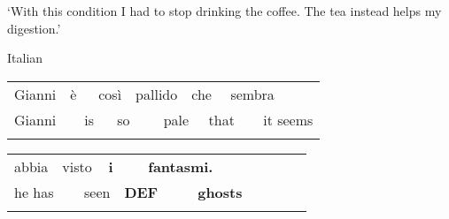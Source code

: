 \begin{styleTranslation}
‘With this condition I had to stop drinking the coffee. The tea instead helps my digestion.’

\end{styleTranslation}

\begin{listWWNumileveli}
\item {}

\begin{styleExample}
\label{bkm:Ref172696628}Italian

\end{styleExample}

\end{listWWNumileveli}

\begin{tabular}{llllllllllll}
\lsptoprule
Gianni & \multicolumn{2}{l}{è

} & \multicolumn{2}{l}{così

} & \multicolumn{2}{l}{pallido

} & \multicolumn{2}{l}{che

} & \multicolumn{2}{l}{sembra

} & \\
\multicolumn{2}{l}{Gianni

} & \multicolumn{2}{l}{is

} & \multicolumn{2}{l}{so

} & \multicolumn{2}{l}{pale

} & \multicolumn{2}{l}{that

} & \multicolumn{2}{l}{it seems

}\\
\lspbottomrule
\end{tabular}

\begin{tabular}{llllllllllll}
\lsptoprule
abbia & \multicolumn{2}{l}{visto

} & \multicolumn{2}{l}{{\bfseries i}

} & \multicolumn{2}{l}{{\bfseries fantasmi.}

} & \multicolumn{2}{l}{} & \multicolumn{2}{l}{} & \\
\multicolumn{2}{l}{he has

} & \multicolumn{2}{l}{seen

} & \multicolumn{2}{l}{{\bfseries DEF}

} & \multicolumn{2}{l}{{\bfseries ghosts}

} & \multicolumn{2}{l}{} & \multicolumn{2}{l}{}\\
\lspbottomrule
\end{tabular}

